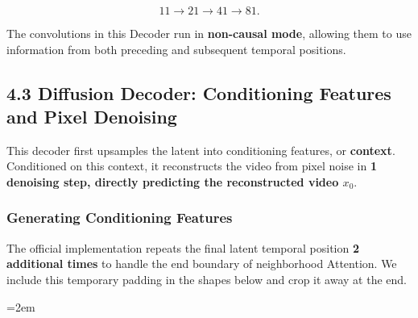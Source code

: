 \documentclass[
  11pt,
  a4paper,
]{article}
\newcommand{\NotesTableStyle}{\linespread{1}\fontsize{9.5pt}{13pt}\selectfont\setlength{\tabcolsep}{4pt}\renewcommand{\arraystretch}{1.1}\setlength{\extrarowheight}{5pt}\setlength{\LTpre}{5pt}\setlength{\LTpost}{6pt}\setlength{\parskip}{0pt}\emergencystretch=2em}
\begin{document}
\[
11\rightarrow21\rightarrow41\rightarrow81.
\]

The convolutions in this Decoder run in \textbf{non-causal mode},
allowing them to use information from both preceding and subsequent
temporal positions.


\subsection{4.3 Diffusion Decoder: Conditioning Features and Pixel
Denoising}\label{ltx25-diffusion-decoder}

This decoder first upsamples the latent into conditioning features, or
\textbf{context}. Conditioned on this context, it reconstructs the video
from pixel noise in \textbf{1 denoising step, directly predicting the
reconstructed video \(x_0\)}.


\subsubsection{Generating Conditioning Features}\label{ltx25-context}

The official implementation repeats the final latent temporal position
\textbf{2 additional times} to handle the end boundary of neighborhood
Attention. We include this temporary padding in the shapes below and
crop it away at the end.

\begingroup\NotesTableStyle\fontsize{10pt}{12pt}\selectfont\renewcommand{\arraystretch}{1.02}\setlength{\extrarowheight}{1pt}
\end{document}

